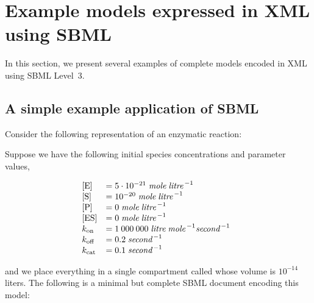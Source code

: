 
\section{Example models expressed in XML using SBML}
\label{sec:xml-rep}
\label{sec:examples}

In this section, we present several examples of complete models
encoded in XML using SBML Level~3.



\subsection{A simple example application of SBML}
\label{sec:modeleg}

Consider the following representation of an enzymatic reaction:
\begin{center}
\end{center}
Suppose we have the following initial species concentrations and
parameter values,
\begin{linenomath}
  \begin{equation*}
    \begin{array}{@{}lll@{}}
      \textrm{[E]}   & = 5 \cdot 10^{-21}\; \emph{mole} \; \emph{litre}^{\,-1}\\
      \textrm{[S]}   & = 10^{-20}\; \emph{mole} \; \emph{litre}^{\,-1}\\
      \textrm{[P]}   & = 0\; \emph{mole} \; \emph{litre}^{\,-1}\\
      \textrm{[ES]}  & = 0\; \emph{mole} \; \emph{litre}^{\,-1}\\
      k_{\text{on}}  & = 1\:000\:000 \;\emph{litre} \;\emph{mole}^{\,-1} \emph{second}^{\,-1}\\
      k_{\text{off}} & = 0.2 \;\emph{second}^{\,-1}\\
      k_{\text{cat}} & = 0.1 \;\emph{second}^{\,-1}
    \end{array}
  \end{equation*}
\end{linenomath}
and we place everything in a single compartment called
 whose volume is $10^{-14}$ liters.  The following
is a minimal but complete SBML document encoding this model:

